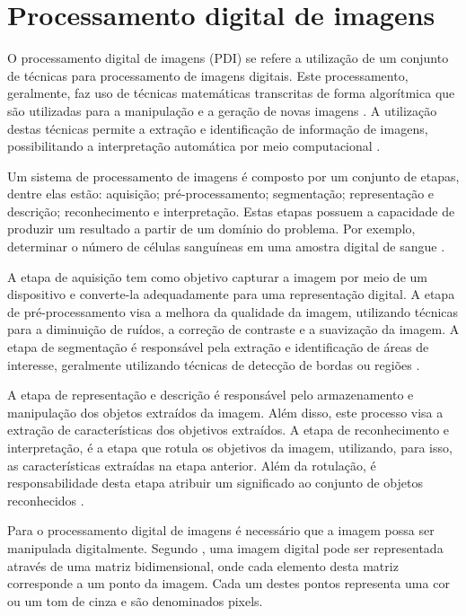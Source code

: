 \documentclass[
	12pt,				%
	oneside,			%
	a4paper,			%
	english,			%
	french,				%
	spanish,			%
	brazil,				%
	]{abntex2}
\begin{document}
\chapter{Processamento digital de imagens}

O  processamento digital de imagens (PDI) se refere a utilização de um conjunto de técnicas para processamento de imagens digitais. Este processamento, geralmente, faz uso de técnicas matemáticas transcritas de forma algorítmica que são utilizadas para a manipulação e a geração de novas imagens \cite{gonzalesWoods:2008}. A utilização destas técnicas permite a extração e identificação de informação de imagens, possibilitando a interpretação automática por meio computacional \cite{pedriniSchwartz:2008}.

Um sistema de processamento de imagens é composto por um conjunto de etapas, dentre elas estão: aquisição; pré-processamento; segmentação; representação e descrição; reconhecimento e interpretação. Estas etapas possuem a capacidade de produzir um resultado a partir de um domínio do problema. Por exemplo, determinar o número de células sanguíneas em uma amostra digital de sangue \cite{pedriniSchwartz:2008}.

A etapa de aquisição tem como objetivo capturar a imagem por meio de um dispositivo e converte-la adequadamente para uma representação digital. A etapa de pré-processamento visa a melhora da qualidade da imagem, utilizando técnicas para a diminuição de ruídos, a correção de contraste e a suavização da imagem. A etapa de segmentação é responsável pela extração e identificação de áreas de interesse, geralmente utilizando técnicas de detecção de bordas ou regiões \cite{pedriniSchwartz:2008}.

A etapa de representação e descrição é responsável  pelo armazenamento e manipulação dos objetos extraídos da imagem. Além disso, este processo visa a extração de características dos objetivos extraídos. A etapa de reconhecimento e interpretação, é a etapa que rotula os objetivos da imagem, utilizando, para isso, as características extraídas na etapa anterior. Além da rotulação, é responsabilidade desta etapa atribuir um significado ao conjunto de objetos reconhecidos \cite{pedriniSchwartz:2008}. 


Para o processamento digital de imagens é necessário que a imagem possa ser manipulada digitalmente. Segundo \citet{pedriniSchwartz:2008}, uma imagem digital pode ser representada através de uma matriz bidimensional, onde cada elemento desta matriz corresponde a um ponto da imagem. Cada um destes pontos representa uma cor ou um tom de cinza e são denominados pixels. 
\end{document}
